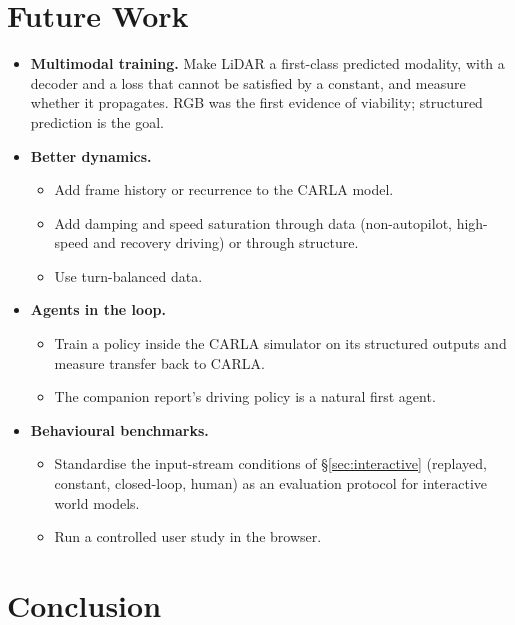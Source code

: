 \documentclass[11pt]{article}
\begin{document}
\section{Future Work}
\label{sec:future}

\begin{itemize}
  \item \textbf{Multimodal training.} Make LiDAR a first-class predicted modality, with a decoder and a loss that cannot be satisfied by a constant, and measure whether it propagates. RGB was the first evidence of viability; structured prediction is the goal.
  \item \textbf{Better dynamics.}
  \begin{itemize}
    \item Add frame history or recurrence to the CARLA model.
    \item Add damping and speed saturation through data (non-autopilot, high-speed and recovery driving) or through structure.
    \item Use turn-balanced data.
  \end{itemize}
  \item \textbf{Agents in the loop.}
  \begin{itemize}
    \item Train a policy inside the CARLA simulator on its structured outputs and measure transfer back to CARLA.
    \item The companion report's driving policy is a natural first agent.
  \end{itemize}
  \item \textbf{Behavioural benchmarks.}
  \begin{itemize}
    \item Standardise the input-stream conditions of \S\ref{sec:interactive} (replayed, constant, closed-loop, human) as an evaluation protocol for interactive world models.
    \item Run a controlled user study in the browser.
  \end{itemize}
\end{itemize}

\section{Conclusion}
\label{sec:conclusion}
\end{document}

